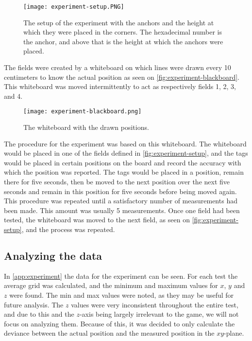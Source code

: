 \begin{figure}[H]
    \centering
    \texttt{[image: experiment-setup.PNG]}
    \caption{The setup of the experiment with the anchors and the height at which they were placed in the corners. The hexadecimal number is the anchor, and above that is the height at which the anchors were placed.}
    \label{fig:experiment-setup}
\end{figure}
\noindent
The fields were created by a whiteboard on which lines were drawn every 10 centimeters to know the actual position as seen on \autoref{fig:experiment-blackboard}.
This whiteboard was moved intermittently to act as respectively fields 1, 2, 3, and 4.

\begin{figure}[H]
    \centering
    \texttt{[image: experiment-blackboard.png]}
    \caption{The whiteboard with the drawn positions.}
    \label{fig:experiment-blackboard}
\end{figure}
\noindent
The procedure for the experiment was based on this whiteboard.
The whiteboard would be placed in one of the fields defined in \autoref{fig:experiment-setup}, and the tags would be placed in certain positions on the board and record the accuracy with which the position was reported.
The tags would be placed in a position, remain there for five seconds, then be moved to the next position over the next five seconds and remain in this position for five seconds before being moved again.
This procedure was repeated until a satisfactory number of measurements had been made.
This amount was usually 5 measurements.
Once one field had been tested, the whiteboard was moved to the next field, as seen on \autoref{fig:experiment-setup}, and the process was repeated.

\subsection{Analyzing the data}
In \autoref{app:experiment} the data for the experiment can be seen.
For each test the average grid was calculated, and the minimum and maximum values for $x$, $y$ and $z$ were found.
The min and max values were noted, as they may be useful for future analysis.
The $z$ values were very inconsistent throughout the entire test, and due to this and the $z$-axis being largely irrelevant to the game, we will not focus on analyzing them.
Because of this, it was decided to only calculate the deviance between the actual position and the measured position in the $xy$-plane.

